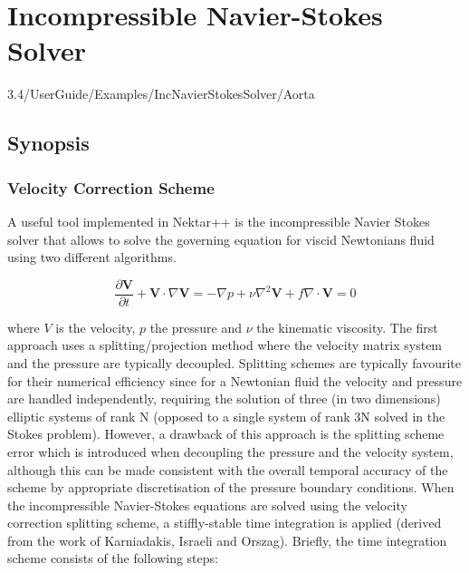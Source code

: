 \chapter{Incompressible Navier-Stokes Solver}
\label{IncNSsolver}
3.4/UserGuide/Examples/IncNavierStokesSolver/Aorta


\section{Synopsis}
\subsection{Velocity Correction Scheme}
\label{VCSscheme}
A useful tool implemented in Nektar++ is the incompressible Navier Stokes solver that allows to solve the governing equation for viscid Newtonians fluid using two different algorithms. 

\begin{subequations}
\begin{equation}
   \frac{\partial \mathbf{V}}{\partial t} + \mathbf{V} \cdot \nabla \mathbf{V} = -\nabla p + \nu \nabla^2 \mathbf{V} + f
 \end{equation}
 
 \begin{equation}
    \nabla \cdot \mathbf{V} = 0
    \end{equation}
 \end{subequations}
 
where $V$ is the velocity, $p$ the pressure and $\nu$ the kinematic viscosity. The first approach uses a splitting/projection method where the velocity matrix system and the pressure are typically decoupled. Splitting schemes are typically favourite for their numerical efficiency since for a Newtonian fluid the velocity and pressure are handled independently, requiring the solution of three (in two dimensions) elliptic systems of rank N (opposed to a single system of rank 3N solved in the Stokes problem). However, a drawback of this approach is the splitting scheme error which is introduced when decoupling the pressure and the velocity system, although this can be made consistent with the overall temporal accuracy of the scheme by appropriate discretisation of the pressure boundary conditions. When the incompressible Navier-Stokes equations are solved using the velocity correction splitting scheme, a stiffly-stable time integration is applied (derived from the work of Karniadakis, Israeli and Orszag).
 Briefly, the time integration scheme consists of the following steps:\\
 
